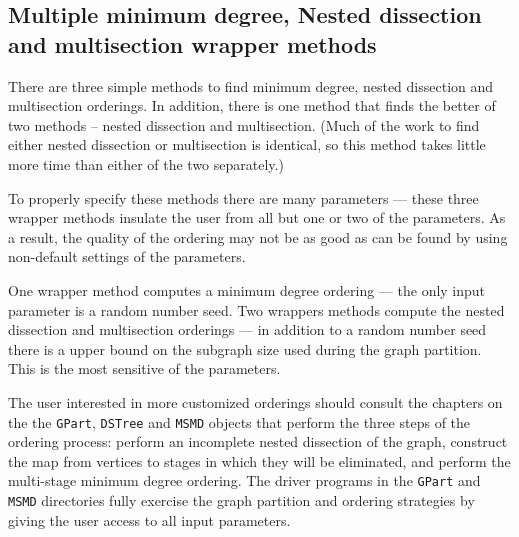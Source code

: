 \subsection{Multiple minimum degree, Nested dissection 
            and multisection wrapper methods}
\par
There are three simple methods to find minimum degree, nested
dissection and multisection orderings.
In addition, there is one method that finds the better of two
methods -- nested dissection and multisection.
(Much of the work to find either nested dissection or multisection
is identical, so this method takes little more time than either of
the two separately.)
\par
To properly specify these methods there are many parameters
--- these three wrapper methods insulate the user from all but one
or two of the parameters.
As a result, the quality of the ordering may not be as good as can
be found by using non-default settings of the parameters.
\par
One wrapper method computes a minimum degree ordering --- the only
input parameter is a random number seed.
Two wrappers methods compute the nested dissection and multisection
orderings --- in addition to a random number seed there is a upper
bound on the subgraph size used during the graph partition.
This is the most sensitive of the parameters.
\par
The user interested in more customized orderings should consult the
chapters on the 
the {\tt GPart}, {\tt DSTree} and {\tt MSMD} objects
that perform the three steps of the ordering process:
perform an incomplete nested dissection of the graph,
construct the map from vertices to stages in which they will be
eliminated, and perform the multi-stage minimum degree ordering.
The driver programs in the {\tt GPart} and {\tt MSMD} directories
fully exercise the graph partition and ordering strategies by
giving the user access to all input parameters.
\par
